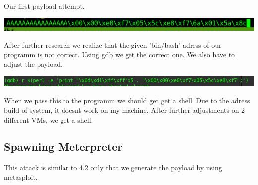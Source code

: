 \documentclass[a4paper,10pt]{article}
\begin{document}
Our first payload attempt.
\begin{center}
\includegraphics[scale=0.5]{pay.png} 
\end{center}
After further research we realize that the given 'bin/bash' adress of our programm is not correct. Using gdb we get the correct one. We also have to adjust the payload.
\begin{center}
 \includegraphics[scale=0.5]{pay3.png}
\end{center}
When we pass this to the programm we should get get a shell. Due to the adress build of system, it doesnt work on my machine. After further adjustments on 2 different VMs, we get a shell.
\newpage
\subsection{Spawning Meterpreter}
This attack is similar to 4.2 only that we generate the payload by using metasploit.
\end{document}
